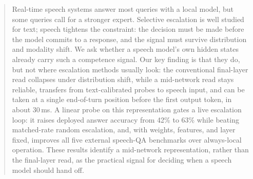 \begin{abstract}
Real-time speech systems answer most queries with a local model, but
some queries call for a stronger expert. Selective escalation is well
studied for text; speech tightens the constraint: the decision must be
made before the model commits to a response, and the signal must
survive distribution and modality shift. We ask whether a speech
model's own hidden states already carry such a competence signal. Our
key finding is that they do, but not where escalation methods usually
look: the conventional final-layer read collapses under distribution
shift, while a mid-network read stays reliable, transfers from
text-calibrated probes to speech input, and can be taken at a single
end-of-turn position before the first output token, in about
30\,ms. A linear probe on this representation gates a live escalation
loop: it raises deployed answer accuracy from 42\% to 63\% while
beating matched-rate random escalation, and, with weights, features,
and layer fixed, improves all five external speech-QA benchmarks over
always-local operation. These results identify a mid-network
representation, rather than the final-layer read, as the practical
signal for deciding when a speech model should hand off.
\end{abstract}
